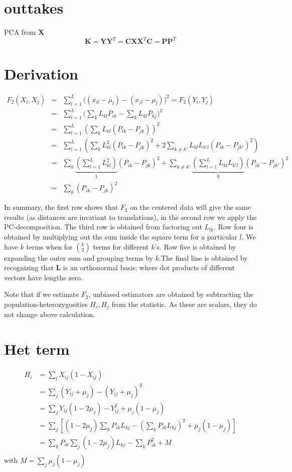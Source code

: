 \documentclass[10pt,a4paper]{article}
\newcommand{\MX}{\mathbf{X}} %
\newcommand{\MC}{\mathbf{C}} %
\newcommand{\MY}{\mathbf{Y}} %
\newcommand{\MP}{\mathbf{P}} %
\newcommand{\ML}{\mathbf{L}} %
\newcommand{\MK}{\mathbf{K}} %
\begin{document}
	
	\section{outtakes}
	PCA from $\MX$
	\begin{equation}
	\MK = \MY \MY^T = \MC\MX\MX^T \MC = \MP\MP^T
	\end{equation}

\appendix
\section{Derivation}\label{appendix:fonpc}
\begin{eqnarray}
F_2(X_i, X_j) &=& \sum_{l=1}^L \big( (x_{il} - \mu_l) -(x_{jl} -\mu_l)\big)^2 = F_2(Y_i, Y_j)\nonumber\\
&=& \sum_{l=1}^L \big( \sum_k L_{kl}P_{ik} - \sum_kL_{kl}P_{kj}\big)^2\nonumber\\
&=& \sum_{l=1}^L \left( \sum_k L_{kl} (P_{ik} -P_{jk}) \right)^2\nonumber\\
&=& \sum_{l=1}^L \left( \sum_k L_{kl}^2 (P_{ik} -P_{jk})^2 + 2\sum_{k\neq k'} L_{kl}L_{k'l}(P_{ik} - P_{jk'})^2 \right)\nonumber\\
&=& \sum_k \underbrace{\left(\sum_{l=1}^L L_{kl}^2\right)}_1 (P_{ik} -P_{jk})^2 + \sum_{k\neq k'}\underbrace{\left(\sum_{l=1}^L L_{kl}L_{k'l}\right)}_{0} (P_{ik} - P_{jk'})^2\nonumber\\
&=& \sum_k (P_{ik} - P_{jk})^2
\end{eqnarray}

In summary, the first row shows that $F_2$ on the centered data will give the same results (as distances are invariant to translations), in the second row we apply the PC-decomposition. The third row is obtained from factoring out $L_{lk}$. Row four is obtained by multiplying out the sum inside the square term for a particular $l$. We have $k$ terms when for $\binom{k}{2}$ terms for different $k$'s.  Row five is obtained by expanding the outer sum and grouping terms by $k$.The final line is obtained by recognizing that $\ML$ is an orthonormal basis; where dot products of different vectors have lengths zero.

Note that if we estimate $F_2$, unbiased estimators are obtained by subtracting the population-heterozygosities $H_i, H_j$ from the statistic. As these are scalars, they do not change above calculation.

\section{Het term}
\begin{align}
H_i &= \sum_l X_{ij} (1-X_{ij})\\
&= \sum_j (Y_{ij} + \mu_j) - (Y_{ij} + \mu_j)^2\\
&= \sum_j Y_{ij}(1-2\mu_j) - Y_{ij}^2 + \mu_j(1-\mu_j)\\
&= \sum_j \left[(1-2\mu_j)\sum_k P_{ik}L_{kj} - \left(\sum_k P_{ik}L_{kj}\right)^2 +  \mu_j(1-\mu_j)\right] \\
&= \sum_k P_{ik} \sum_j (1-2\mu_j)L_{kj} - \sum_k P_{ik}^2 + M \\
\end{align}
with $M= \sum_j \mu_j(1-\mu_j)$
\end{document}
